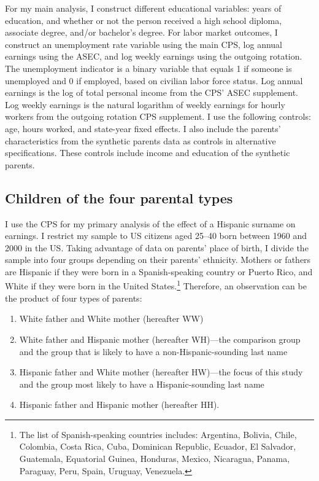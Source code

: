 For my main analysis, I construct different educational variables: years of education, and whether or not the person received a high school diploma, associate degree, and/or bachelor’s degree. For labor market outcomes, I construct an unemployment rate variable using the main CPS, log annual earnings using the ASEC, and log weekly earnings using the outgoing rotation. The unemployment indicator is a binary variable that equals 1 if someone is unemployed and 0 if employed, based on civilian labor force status. Log annual earnings is the log of total personal income from the CPS’ ASEC supplement. Log weekly earnings is the natural logarithm of weekly earnings for hourly workers from the outgoing rotation CPS supplement. I use the following controls: age, hours worked, and state-year fixed effects. I also include the parents’ characteristics from the synthetic parents data as controls in alternative specifications. These controls include income and education of the synthetic parents.

\subsection{Children of the four parental types}

I use the CPS for my primary analysis of the effect of a Hispanic surname on earnings. I restrict my sample to US citizens  aged 25–40 born between 1960 and 2000 in the US. Taking advantage of data on parents’ place of birth, I divide the sample into four groups depending on their parents’ ethnicity. Mothers or fathers are Hispanic if they were born in a Spanish-speaking country or Puerto Rico, and White if they were born in the United States.\footnote{The list of Spanish-speaking countries includes: Argentina, Bolivia, Chile, Colombia, Costa Rica, Cuba, Dominican Republic, Ecuador, El Salvador, Guatemala, Equatorial Guinea, Honduras, Mexico, Nicaragua, Panama, Paraguay, Peru, Spain, Uruguay, Venezuela.} Therefore, an observation can be the product of four types of parents:
\begin{enumerate}
\item White father and White mother (hereafter WW) 
\item White father and Hispanic mother (hereafter WH)---the comparison group and the group that is likely to have a non-Hispanic-sounding last name
\item Hispanic father and White mother (hereafter HW)---the focus of this study and the group most likely to have a Hispanic-sounding last name
\item Hispanic father and Hispanic mother (hereafter HH).
\end{enumerate}

